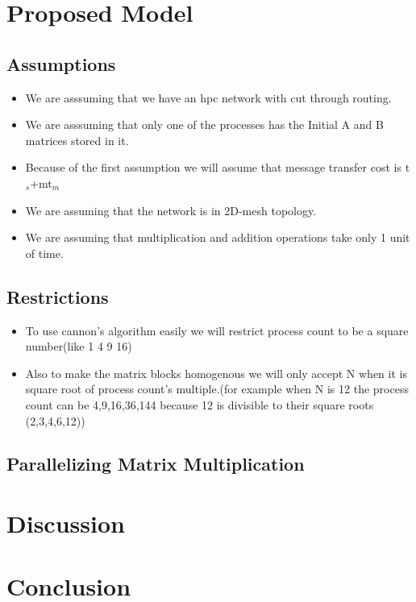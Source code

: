 \documentclass[12pt]{article}
\begin{document}
	\section{Proposed Model}
	\subsection{Assumptions}
	\begin{itemize}
		\item We are asssuming that we have an hpc network with cut through routing.
		\item We are asssuming that only one of the processes has the Initial A and B matrices stored in it.
		\item Because of the first assumption we will assume that message transfer cost is t$_s$+mt$_m$
		\item We are assuming that the network is in 2D-mesh topology.
		\item We are assuming that multiplication and addition operations take only 1 unit of time.
	\end{itemize}
	\subsection{Restrictions}
	\begin{itemize}
		\item To use cannon's algorithm easily we will restrict process count to be a square number(like 1 4 9 16)
		\item Also to make the matrix blocks homogenous we will only accept N when it is square root of process count's multiple.(for example when N is 12 the process count can be 4,9,16,36,144 because 12 is divisible to their square roots (2,3,4,6,12))
		
	\end{itemize}
	
	\subsection{ Parallelizing Matrix Multiplication}
	
	
	\section{Discussion}
	
	
	\section{Conclusion}
	
\end{document}
